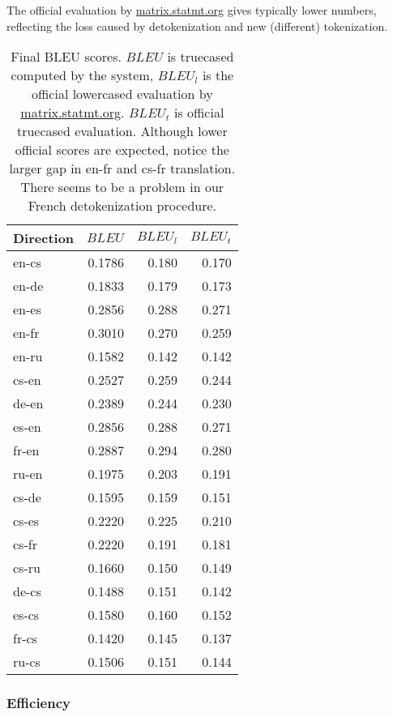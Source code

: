 \documentclass[11pt,letterpaper]{article}
\begin{document}
The official evaluation by \url{matrix.statmt.org} gives typically
lower numbers, reflecting the loss caused by detokenization and
new (different) tokenization.

\begin{table}[htbl]
\begin{center}
\begin{tabular}{l | r r r}
Direction & $BLEU$ & $BLEU_l$ & $BLEU_t$\\
\hline
en-cs & 0.1786 & 0.180 & 0.170\\
en-de & 0.1833 & 0.179 & 0.173\\
en-es & 0.2856 & 0.288 & 0.271\\
en-fr & 0.3010 & 0.270 & 0.259\\
en-ru & 0.1582 & 0.142 & 0.142\\
cs-en & 0.2527 & 0.259 & 0.244\\
de-en & 0.2389 & 0.244 & 0.230\\
es-en & 0.2856 & 0.288 & 0.271\\
fr-en & 0.2887 & 0.294 & 0.280\\
ru-en & 0.1975 & 0.203 & 0.191\\
\hline
cs-de & 0.1595 & 0.159 & 0.151\\
cs-es & 0.2220 & 0.225 & 0.210\\
cs-fr & 0.2220 & 0.191 & 0.181\\
cs-ru & 0.1660 & 0.150 & 0.149\\
de-cs & 0.1488 & 0.151 & 0.142\\
es-cs & 0.1580 & 0.160 & 0.152\\
fr-cs & 0.1420 & 0.145 & 0.137\\
ru-cs & 0.1506 & 0.151 & 0.144\\
\end{tabular}
\end{center}
\caption{Final BLEU scores. $BLEU$ is truecased computed by the system, $BLEU_l$ is the official lowercased evaluation by \url{matrix.statmt.org}. $BLEU_t$ is official truecased evaluation. Although lower official scores are expected, notice the larger gap in en-fr and cs-fr translation. There seems to be a problem in our French detokenization procedure.}
\label{tab:finalbleu}
\end{table}


\subsubsection{Efficiency}
\label{sec:efficiency}
\end{document}
